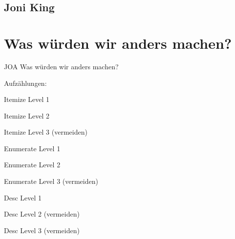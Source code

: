 \subsection{Joni King}
\section{Was würden wir anders machen?}
JOA Was würden wir anders machen?

Aufzählungen:

\begin{compactitem}
    \item Itemize Level 1
    \begin{compactitem}
        \item Itemize Level 2
        \begin{compactitem}
            \item Itemize Level 3 (vermeiden)
        \end{compactitem}
    \end{compactitem}
\end{compactitem}

\begin{compactenum}
    \item Enumerate Level 1
    \begin{compactenum}
        \item Enumerate Level 2
        \begin{compactenum}
            \item Enumerate Level 3 (vermeiden)
        \end{compactenum}
    \end{compactenum}
\end{compactenum}

\begin{compactdesc}
    \item[Desc] Level 1
    \begin{compactdesc}
        \item[Desc] Level 2 (vermeiden)
        \begin{compactdesc}
            \item[Desc] Level 3 (vermeiden)
        \end{compactdesc}
    \end{compactdesc}
\end{compactdesc}